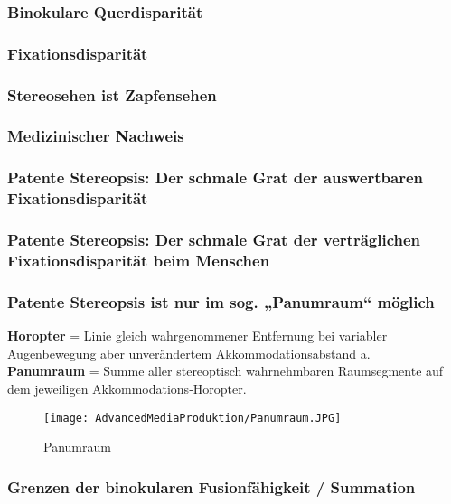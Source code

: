 \subsubsection{Binokulare Querdisparität}

\subsubsection{Fixationsdisparität}

\subsubsection{Stereosehen ist Zapfensehen}

\subsubsection{Medizinischer Nachweis}

\subsubsection{Patente Stereopsis: Der schmale Grat der auswertbaren Fixationsdisparität}

\subsubsection{Patente Stereopsis: Der schmale Grat der verträglichen Fixationsdisparität beim Menschen}

\subsubsection{Patente Stereopsis ist nur im sog. „Panumraum“ möglich}
\textbf{Horopter} = Linie gleich wahrgenommener Entfernung bei variabler Augenbewegung aber unverändertem Akkommodationsabstand a.\\
\textbf{Panumraum} = Summe aller stereoptisch wahrnehmbaren Raumsegmente auf dem jeweiligen Akkommodations‐Horopter.\\

\begin{figure}[H] 
  \centering
	\texttt{[image: AdvancedMediaProduktion/Panumraum.JPG]} 
  \caption{Panumraum}
  \label{fig:Bild2}
\end{figure}


\subsubsection{Grenzen der binokularen Fusionfähigkeit / Summation}

